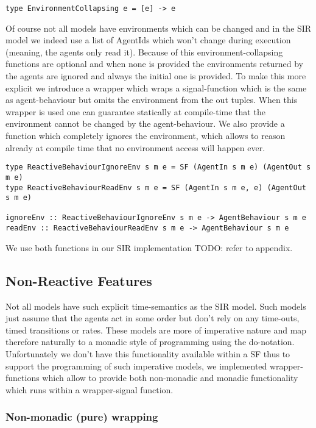 \begin{verbatim}
type EnvironmentCollapsing e = [e] -> e
\end{verbatim}

Of course not all models have environments which can be changed and in the SIR model we indeed use a list of AgentIds which won't change during execution (meaning, the agents only read it). Because of this environment-collapsing functions are optional and when none is provided the environments returned by the agents are ignored and always the initial one is provided.
To make this more explicit we introduce a wrapper which wraps a signal-function which is the same as agent-behaviour but omits the environment from the out tuples. When this wrapper is used one can guarantee statically at compile-time that the environment cannot be changed by the agent-behaviour. We also provide a function which completely ignores the environment, which allows to reason already at compile time that no environment access will happen ever.

\begin{verbatim}
type ReactiveBehaviourIgnoreEnv s m e = SF (AgentIn s m e) (AgentOut s m e)
type ReactiveBehaviourReadEnv s m e = SF (AgentIn s m e, e) (AgentOut s m e)

ignoreEnv :: ReactiveBehaviourIgnoreEnv s m e -> AgentBehaviour s m e 
readEnv :: ReactiveBehaviourReadEnv s m e -> AgentBehaviour s m e 
\end{verbatim}

We use both functions in our SIR implementation TODO: refer to appendix.

\subsection{Non-Reactive Features}
Not all models have such explicit time-semantics as the SIR model. Such models just assume that the agents act in some order but don't rely on any time-outs, timed transitions or rates. These models are more of imperative nature and map therefore naturally to a monadic style of programming using the do-notation. Unfortunately we don't have this functionality available within a SF thus to support the programming of such imperative models, we implemented wrapper-functions which allow to provide both non-monadic and monadic functionality which runs within a wrapper-signal function.

\subsubsection{Non-monadic (pure) wrapping}


